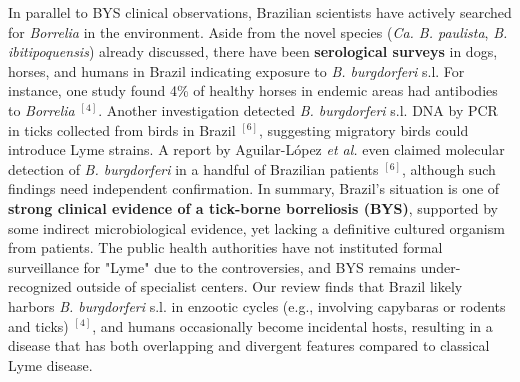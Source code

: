 \documentclass[11pt,letterpaper]{article}
\newcommand{\mycite}[1]{$^{[#1]}$}
\begin{document}
In parallel to BYS clinical observations, Brazilian scientists have actively searched for \textit{Borrelia} in the environment. Aside from the novel species (\textit{Ca. B. paulista}, \textit{B. ibitipoquensis}) already discussed, there have been \textbf{serological surveys} in dogs, horses, and humans in Brazil indicating exposure to \textit{B. burgdorferi} s.l. For instance, one study found 4\% of healthy horses in endemic areas had antibodies to \textit{Borrelia} \mycite{4}. Another investigation detected \textit{B. burgdorferi} s.l. DNA by PCR in ticks collected from birds in Brazil \mycite{6}, suggesting migratory birds could introduce Lyme strains. A report by Aguilar-López \textit{et al.} even claimed molecular detection of \textit{B. burgdorferi} in a handful of Brazilian patients \mycite{6}, although such findings need independent confirmation. In summary, Brazil's situation is one of \textbf{strong clinical evidence of a tick-borne borreliosis (BYS)}, supported by some indirect microbiological evidence, yet lacking a definitive cultured organism from patients. The public health authorities have not instituted formal surveillance for "Lyme" due to the controversies, and BYS remains under-recognized outside of specialist centers. Our review finds that Brazil likely harbors \textit{B. burgdorferi} s.l. in enzootic cycles (e.g., involving capybaras or rodents and ticks) \mycite{4}, and humans occasionally become incidental hosts, resulting in a disease that has both overlapping and divergent features compared to classical Lyme disease.
\end{document}
